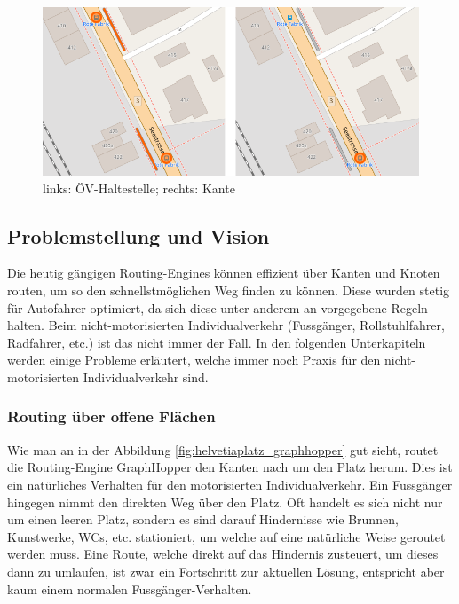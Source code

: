 \begin{figure}[ht]
\centering
\includegraphics[width=0.7\linewidth]{technicalreport/img/public_transport_stop}
\caption[Unterschied ÖV-Haltestelle und Kante]{links: ÖV-Haltestelle; rechts: Kante}
\label{fig:public_transport_stop}
\end{figure}


\subsection{Problemstellung und Vision}
\label{Problemstellung und Vision}
Die heutig gängigen Routing-Engines können effizient über Kanten und Knoten routen, um so den schnellstmöglichen Weg finden zu können. Diese wurden stetig für Autofahrer optimiert, da sich diese unter anderem an vorgegebene Regeln halten. Beim nicht-motorisierten Individualverkehr (Fussgänger, Rollstuhlfahrer, Radfahrer, etc.)  ist das nicht immer der Fall. In den folgenden Unterkapiteln werden einige Probleme erläutert, welche immer noch Praxis für den nicht-motorisierten Individualverkehr sind.

\subsubsection{Routing über offene Flächen}
\label{problem:Routing über offene Flächen}
Wie man an in der Abbildung \ref{fig:helvetiaplatz_graphhopper} gut sieht, routet die Routing-Engine GraphHopper \cite{graphhopper} den Kanten nach um den Platz herum. Dies ist ein natürliches Verhalten für den motorisierten Individualverkehr. Ein Fussgänger hingegen nimmt den direkten Weg über den Platz. Oft handelt es sich nicht nur um einen leeren Platz, sondern es sind darauf Hindernisse wie Brunnen, Kunstwerke, WCs, etc. stationiert, um welche auf eine natürliche Weise geroutet werden muss. Eine Route, welche direkt auf das Hindernis zusteuert, um dieses dann zu umlaufen, ist zwar ein Fortschritt zur aktuellen Lösung, entspricht aber kaum einem normalen Fussgänger-Verhalten. 

